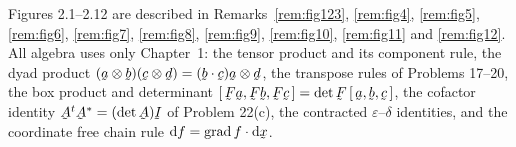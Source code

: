 \documentclass[17pt,a4paper]{extreport}
\DeclareRobustCommand{\vek}[1]{\underaccent{\tilde}{#1}}
\newcommand{\grad}{\operatorname{grad}}
\newcommand{\I}{\vek{I}}
\newcommand{\ba}{\vek{a}}
\newcommand{\bb}{\vek{b}}
\newcommand{\bc}{\vek{c}}
\newcommand{\bd}{\vek{d}}
\newcommand{\bx}{\vek{x}}
\newcommand{\bA}{\vek{A}}
\newcommand{\bF}{\vek{F}}
\newcommand{\dd}{\delta}
\newcommand{\eps}{\varepsilon}
\newcommand{\dl}{\mathrm{d}}
\newcommand{\tbox}[3]{[\,#1,#2,#3\,]}
\newcommand{\ip}[2]{#1\cdot#2}
\theoremstyle{scplain}
\theoremstyle{scdefn}
\begin{document}
\medskip\noindent
Figures 2.1--2.12 are described in Remarks~\ref{rem:fig123}, \ref{rem:fig4},
\ref{rem:fig5}, \ref{rem:fig6}, \ref{rem:fig7}, \ref{rem:fig8},
\ref{rem:fig9}, \ref{rem:fig10}, \ref{rem:fig11} and \ref{rem:fig12}. All
algebra uses only Chapter~1: the tensor product and its component rule, the
dyad product $(\ba\otimes\bb)(\bc\otimes\bd)=(\ip\bb\bc)\ba\otimes\bd$, the
transpose rules of Problems 17--20, the box product and determinant
$\tbox{\bF\ba}{\bF\bb}{\bF\bc}=\det\bF\,\tbox\ba\bb\bc$, the cofactor
identity $\bA^{t}\bA^{*}=(\det\bA)\I$ of Problem 22(c), the contracted
$\eps$--$\dd$ identities, and the coordinate free chain rule
$\dl f=\ip{\grad f}{\dl\bx}$.
\end{document}
